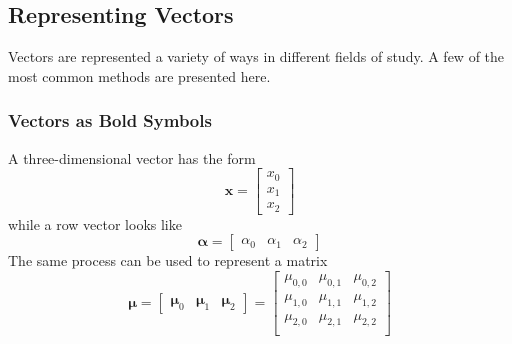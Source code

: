 \subsection{Representing Vectors}
    Vectors are represented a variety of ways in different fields of study.
    A few of the most common methods are presented here.

\subsubsection{Vectors as Bold Symbols}\label{sec:VectorsBoldSymbols}
    A three-dimensional vector has the form
    \begin{equation}
        \bm{x}
            =\begin{bmatrix}
                x_0 \\ x_1 \\ x_2
             \end{bmatrix}
    \end{equation}
    while a row vector looks like
    \begin{equation}
        \bm{\alpha}
            =\begin{bmatrix}
                \alpha_0 & \alpha_1 & \alpha_2
             \end{bmatrix}
    \end{equation}
    The same process can be used to represent a matrix
    \begin{equation}
        \bm{\mu}
            =\begin{bmatrix}
                \bm{\mu}_0 & \bm{\mu}_1 & \bm{\mu}_{2}
             \end{bmatrix}
            =\begin{bmatrix}
                \mu_{0,0} & \mu_{0,1} & \mu_{0,2} \\
                \mu_{1,0} & \mu_{1,1} & \mu_{1,2} \\
                \mu_{2,0} & \mu_{2,1} & \mu_{2,2} \\
             \end{bmatrix}
    \end{equation}

